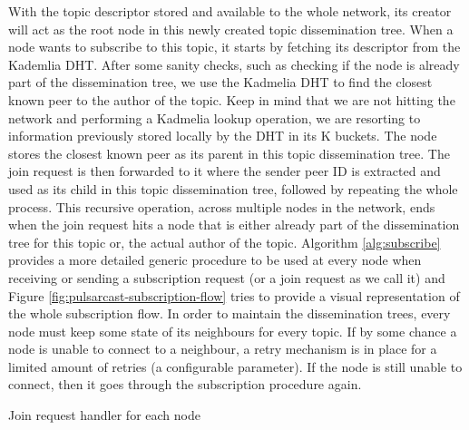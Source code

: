 With the topic descriptor stored and available to the whole network, its
creator will act as the root node in this newly created topic dissemination
tree. When a node wants to subscribe to this topic, it starts by fetching its
descriptor from the Kademlia DHT. After some sanity checks, such as
checking if the node is already part of the dissemination tree, we use the
Kadmelia DHT to find the closest known peer to the author of the
topic. Keep in mind that we are not hitting the network and performing a
Kadmelia lookup operation, we are resorting to information previously stored
locally by the DHT in its K buckets. The node stores the closest
known peer as its parent in this topic dissemination tree. The join request is
then forwarded to it where the sender peer ID is extracted and used
as its child in this topic dissemination tree, followed by repeating the whole
process. This recursive operation, across multiple nodes in the network, ends
when the join request hits a node that is either already part of the
dissemination tree for this topic or, the actual author of the topic. Algorithm
\ref{alg:subscribe} provides a more detailed generic procedure to be used at
every node when receiving or sending a subscription request (or a join request
as we call it) and Figure \ref{fig:pulsarcast-subscription-flow} tries to
provide a visual representation of the whole subscription flow. In order to
maintain the dissemination trees, every node must keep some state of its
neighbours for every topic. If by some chance a node is unable to connect to a
neighbour, a retry mechanism is in place for a limited amount of retries (a
configurable parameter). If the node is still unable to connect, then it goes
through the subscription procedure again.

\vspace{8pt}
\begin{algorithm}
  \SetAlgoLined
  \caption{Join request handler for each node}
    \label{alg:subscribe}
\end{algorithm}
\vspace{8pt}

